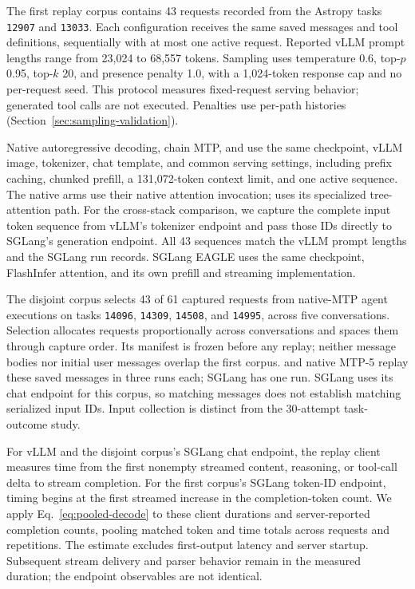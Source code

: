 The first replay corpus contains 43 requests recorded from the Astropy tasks \texttt{12907} and \texttt{13033}. Each configuration receives the same saved messages and tool definitions, sequentially with at most one active request. Reported vLLM prompt lengths range from 23,024 to 68,557 tokens. Sampling uses temperature 0.6, top-$p$ 0.95, top-$k$ 20, and presence penalty 1.0, with a 1,024-token response cap and no per-request seed. This protocol measures fixed-request serving behavior; generated tool calls are not executed. Penalties use per-path histories (Section~\ref{sec:sampling-validation}).

Native autoregressive decoding, chain MTP, and \sys{} use the same checkpoint, vLLM image, tokenizer, chat template, and common serving settings, including prefix caching, chunked prefill, a 131,072-token context limit, and one active sequence. The native arms use their native attention invocation; \sys{} uses its specialized tree-attention path. For the cross-stack comparison, we capture the complete input token sequence from vLLM's tokenizer endpoint and pass those IDs directly to SGLang's generation endpoint. All 43 sequences match the vLLM prompt lengths and the SGLang run records. SGLang EAGLE uses the same checkpoint, FlashInfer attention, and its own prefill and streaming implementation.

The disjoint corpus selects 43 of 61 captured requests from native-MTP agent executions on tasks \texttt{14096}, \texttt{14309}, \texttt{14508}, and \texttt{14995}, across five conversations. Selection allocates requests proportionally across conversations and spaces them through capture order. Its manifest is frozen before any replay; neither message bodies nor initial user messages overlap the first corpus. \sys{} and native MTP-5 replay these saved messages in three runs each; SGLang has one run. SGLang uses its chat endpoint for this corpus, so matching messages does not establish matching serialized input IDs. Input collection is distinct from the 30-attempt task-outcome study.

For vLLM and the disjoint corpus's SGLang chat endpoint, the replay client measures time from the first nonempty streamed content, reasoning, or tool-call delta to stream completion. For the first corpus's SGLang token-ID endpoint, timing begins at the first streamed increase in the completion-token count. We apply Eq.~\ref{eq:pooled-decode} to these client durations and server-reported completion counts, pooling matched token and time totals across requests and repetitions. The estimate excludes first-output latency and server startup. Subsequent stream delivery and parser behavior remain in the measured duration; the endpoint observables are not identical.
